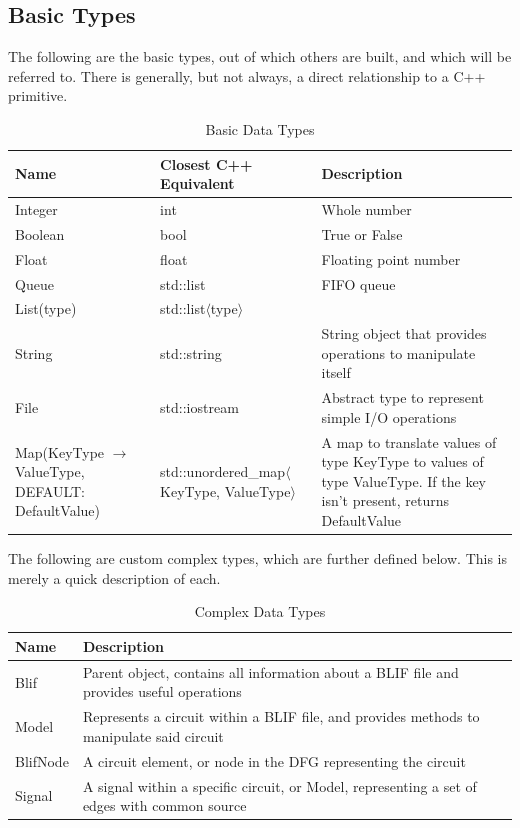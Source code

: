 \documentclass[12pt,final,oneside]{dwThesis} %
\begin{document}
   \subsection{Basic Types}
   The following are the basic types, out of which others are built, and which will be referred to. There is generally, but not always, a direct relationship to a C++ primitive.
   \begin{table}
      \begin{tabularx}{\linewidth}{XXX}
         \toprule
         Name & Closest C++ Equivalent & Description\\
         \midrule
         Integer &  int & Whole number \\
         Boolean &  bool & True or False \\
         Float & float & Floating point number \\
         Queue & std::list & FIFO queue \\
         List(type) & std::list$\langle$type$\rangle$ & \\
         String & std::string & String object that provides operations to manipulate itself \\
         File & std::iostream & Abstract type to represent simple I/O operations \\
         Map(KeyType $\to$ ValueType, DEFAULT:  DefaultValue) & std::unordered\_map$\langle$KeyType, ValueType$\rangle$ &  A map to translate values of type KeyType to values of type ValueType. If the key isn't present, returns DefaultValue \\
         \bottomrule
      \end{tabularx}
      \caption{Basic Data Types}
   \end{table}
   The following are custom complex types, which are further defined below. This is merely a quick description of each.
   \begin{table}
      \begin{tabularx}{\linewidth}{lX}
         \toprule
         Name & Description\\
         \midrule
         Blif & Parent object, contains all information about a \gls{BLIF} file and provides useful operations \\
         Model & Represents a circuit within a \gls{BLIF} file, and provides methods to manipulate said circuit \\
         BlifNode & A circuit element, or node in the \gls{DFG} representing the circuit \\
         Signal & A signal within a specific circuit, or Model, representing a set of edges with common source \\
         \bottomrule
      \end{tabularx}
      \caption{Complex Data Types}
   \end{table}
\end{document}
